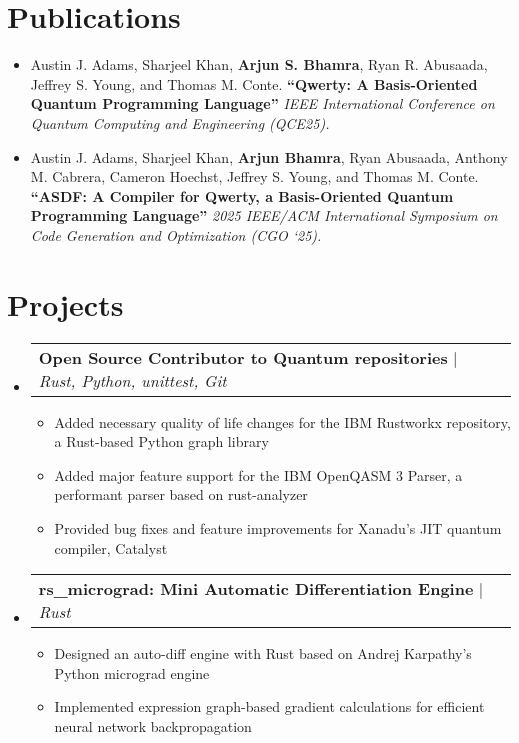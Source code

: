 \documentclass[letterpaper,11pt]{article}
\makeatletter
\newcommand{\resumeItem}[1]{
  \item\small{
    {#1 \vspace{-1pt}}
  }
}
\newcommand{\resumeProjectHeading}[2]{
    \item
    \begin{tabular*}{0.97\textwidth}{l@{\extracolsep{\fill}}r}
      \small#1 & #2 \\
    \end{tabular*}\vspace{-7pt}
}
\newcommand{\resumeSubHeadingListStart}{\begin{itemize}[leftmargin=0.15in, label={}]}
\newcommand{\resumeSubHeadingListEnd}{\end{itemize}}
\newcommand{\resumeItemListStart}{\begin{itemize}}
\newcommand{\resumeItemListEnd}{\end{itemize}\vspace{-5pt}}
\makeatother
\begin{document}
\section{Publications}
    \resumeSubHeadingListStart
      \resumeItem{Austin J. Adams, Sharjeel Khan, \textbf{Arjun S. Bhamra}, Ryan R. Abusaada, Jeffrey S. Young, and Thomas M. Conte. \textbf{“Qwerty: A Basis-Oriented Quantum Programming Language”} \textit{IEEE International Conference on Quantum Computing and Engineering (QCE25).}}
      \resumeItem{Austin J. Adams, Sharjeel Khan, \textbf{Arjun Bhamra}, Ryan Abusaada, Anthony M. Cabrera, Cameron Hoechst, Jeffrey S. Young, and Thomas M. Conte. \textbf{“ASDF: A Compiler for Qwerty, a Basis-Oriented Quantum Programming Language”} \textit{2025 IEEE/ACM International Symposium on Code Generation and Optimization (CGO ‘25).}}
    \resumeSubHeadingListEnd

\section{Projects}
    \resumeSubHeadingListStart

     \resumeProjectHeading{\textbf{Open Source Contributor to Quantum repositories} $|$ \emph{Rust, Python, unittest, Git}}{}
          \resumeItemListStart
            \resumeItem{Added necessary quality of life changes for the IBM Rustworkx repository, a Rust-based Python graph library}
            \resumeItem{Added major feature support for the IBM OpenQASM 3 Parser, a performant parser based on rust-analyzer}
            \resumeItem{Provided bug fixes and feature improvements for Xanadu's JIT quantum compiler, Catalyst}
          \resumeItemListEnd
          \resumeProjectHeading{\textbf{rs\_micrograd: Mini Automatic Differentiation Engine} $|$ \emph{Rust}}{}
          \resumeItemListStart
            \resumeItem{Designed an auto-diff engine with Rust based on Andrej Karpathy's Python micrograd engine}
            \resumeItem{Implemented expression graph-based gradient calculations for efficient neural network backpropagation}
          \resumeItemListEnd
    \resumeSubHeadingListEnd

\end{document}
